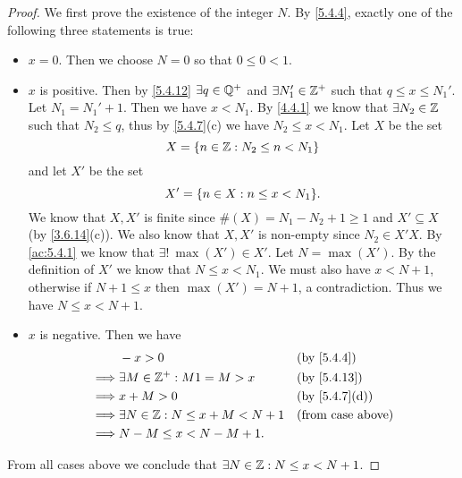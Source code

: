 \begin{proof}
  We first prove the existence of the integer \(N\).
  By \cref{5.4.4}, exactly one of the following three statements is true:
  \begin{itemize}
    \item \(x = 0\).
          Then we choose \(N = 0\) so that \(0 \leq 0 < 1\).
    \item \(x\) is positive.
          Then by \cref{5.4.12} \(\exists q \in \mathbb{Q}^+\) and \(\exists N_1' \in \mathbb{Z}^+\) such that \(q \leq x \leq N_1'\).
          Let \(N_1 = N_1' + 1\).
          Then we have \(x < N_1\).
          By \cref{4.4.1} we know that \(\exists N_2 \in \mathbb{Z}\) such that \(N_2 \leq q\), thus by \cref{5.4.7}(c) we have \(N_2 \leq x < N_1\).
          Let \(X\) be the set
          \[
            X = \left\lbrace n \in \mathbb{Z} : N_2 \leq n < N_1\right\rbrace
          \]
          and let \(X'\) be the set
          \[
            X' = \set{n \in X : n \leq x < N_1}.
          \]
          We know that \(X, X'\) is finite since \(\#(X) = N_1 - N_2 + 1 \geq 1\) and \(X' \subseteq X\) (by \cref{3.6.14}(c)).
          We also know that \(X, X'\) is non-empty since \(N_2 \in X'X\).
          By \cref{ac:5.4.1} we know that \(\exists!\ \max(X') \in X'\).
          Let \(N = \max(X')\).
          By the definition of \(X'\) we know that \(N \leq x < N_1\).
          We must also have \(x < N + 1\), otherwise if \(N + 1 \leq x\) then \(\max(X') = N + 1\), a contradiction.
          Thus we have \(N \leq x < N + 1\).
    \item \(x\) is negative.
          Then we have
          \begin{align*}
                     & -x > 0                                  &  & \by{5.4.4}                  \\
            \implies & \exists M \in \Z^+ : M1 = M > x         &  & \by{5.4.13}                 \\
            \implies & x + M > 0                               &  & \text{(by \cref{5.4.7}(d))} \\
            \implies & \exists N \in \Z : N \leq x + M < N + 1 &  & \text{(from case above)}    \\
            \implies & N - M \leq x < N - M + 1.
          \end{align*}
  \end{itemize}
  From all cases above we conclude that \(\exists N \in \mathbb{Z} : N \leq x < N + 1\).


\end{proof}
